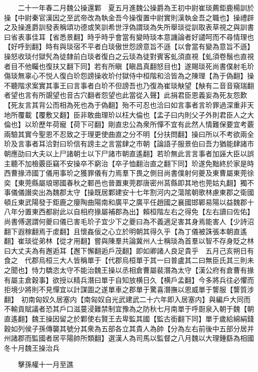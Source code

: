 　　二十一年春二月魏公操還鄴　夏五月進魏公操爵為王初中尉崔琰薦鉅鹿楊訓於操【中尉秦官漢因之至武帝改為執金吾今操復置中尉實則漢執金吾之職也】操禮辟之及操進爵訓發表稱頌功德或笑訓希世浮偽謂琰為失所舉琰從訓取表草視之與訓書曰省表事佳耳【省悉景翻】時乎時乎會當有變時琰本意譏論者好譴呵而不尋情理也【好呼到翻】時有與琰宿不平者白琰傲世怨謗意旨不遜【以會當有變為意旨不遜】操怒收琰付獄髠為徒隸前白琰者復白之云琰為徒對賓客虬須直視【虬須卷鬚也直視者目不他矚也復扶又翻下同】若有所瞋【瞋昌真翻怒目也】遂賜琰死尚書僕射毛玠傷琰無辜心不悦人復白玠怨謗操收玠付獄侍中桓階和洽皆為之陳理【為于偽翻】操不聽階求案實其事王曰言事者白玠不但謗吾也乃復為崔琰觖望【觖有二音音窺瑞翻者望也言有所覬望也音古穴翻者怨望也此當從入聲】此捐君臣恩義妄為死友怨歎【死友言其背公而相為死也為于偽翻】殆不可忍也洽曰如言事者言玠罪過深重非天地所覆載【覆敷又翻】臣非敢曲理玠以枉大倫也【孟子曰内則父子外則君臣人之大倫也】以玠歷年荷寵【荷下可翻】剛直忠公為衆所憚不宜有此然人情難保要宜考覈兩驗其實今聖恩不忍致之于理更使曲直之分不明【分扶問翻】操曰所以不考欲兩全玠及言事者耳洽對曰玠信有謗主之言當肆之市朝【論語子服景伯曰吾力猶能肆諸市朝應劭曰大夫以上尸諸朝士以下尸諸市朝直遙翻】若玠無此言言事者加誣大臣以誤主聽不加檢覈臣竊不安操卒不窮治【卒子恤翻治直之翻下同】玠遂免黜終於家是時西曹掾沛國丁儀用事玠之獲罪儀有力焉羣下畏之側目尚書僕射何夔及東曹屬東莞徐奕【東莞縣屬琅琊國春秋之鄆邑也晉置東莞郡唐密州莒縣即其地也莞姑丸翻】獨不事儀儀譖奕出為魏郡太守【操既居鄴建安十七年割河内之蕩隂朝歌林慮東郡之衛國頓丘東武陽發于鉅鹿之癭陶曲陽南和廣平之廣平任趙國之襄國邯鄲易陽以益魏郡十八年分置東西都尉此以自相府掾屬補郡為出】賴桓階左右之得免【左右讀曰佐佑】尚書傅選謂何夔曰儀已害毛玠子宜少下之夔曰為不義適足害其身焉能害人【少詩沼翻下遐稼翻焉于䖍翻】且懷姦佞之心立於明朝其得久乎【為丁儀被誅張本朝直遙翻】崔琰從弟林【從才用翻】嘗與陳羣共論冀州人士稱琰為首羣以智不存身貶之林曰大丈夫為有邂逅耳【邂下懈翻逅戶茂翻】即如卿諸人良足貴乎　五月己亥朔日有食之　代郡烏桓三大人皆稱單于【代郡烏桓單于其一曰普盧其二曰無臣氏其三則未之聞也】恃力驕恣太守不能治魏王操以丞相倉曹屬裴潛為太守【漢公府有倉曹有掾有屬主倉穀事】欲授以精兵潛曰單于自知放横日久【横戶孟翻】今多將兵往必懼而拒境少將則不見憚宜以計謀圖之遂單車之郡單于驚喜潛撫以恩威單于讋服【讋質涉翻】　初南匈奴久居塞内【南匈奴自光武建武二十六年即入居塞内】與編戶大同而不輸貢賦議者恐其戶口滋蔓浸難禁制宜豫為之防秋七月南單于呼㕑泉入朝于魏【朝直遙翻】魏王操因留之於鄴使右賢王去卑監其國【監古銜翻下同】單于歲給綿絹錢穀如列侯子孫傳襲其號分其衆為五部各立其貴人為帥【分為左右前後中五部分居并州諸郡而監國者居平陽帥所類翻】選漢人為司馬以監督之八月魏以大理鍾繇為相國　冬十月魏王操治兵

　　擊孫權十一月至譙

